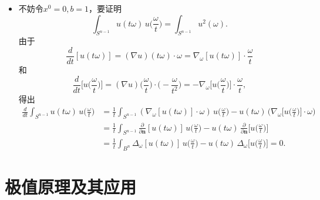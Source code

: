 \begin{itemize}
    \item[12.] 不妨令$x^0=0,b=1$，要证明
    \[\int_{S^{n-1}}u(t\omega)\,u\Big(\frac{\omega}{t}\Big)
    =\int_{S^{n-1}}u^2(\omega).\]
    由于
    \[\frac{d}{dt}[u(t\omega)]=(\nabla u)(t\omega)\cdot\omega
    =\nabla_\omega[u(t\omega)]\cdot\frac{\omega}{t}\]
    和
    \[\frac{d}{dt}\Big[u\Big(\frac{\omega}{t}\Big)\Big]
    =(\nabla u)\Big(\frac{\omega}{t}\Big)\cdot\Big(\!-\frac{\omega}{t^2}\Big)
    =-\nabla_\omega\Big[u\Big(\frac{\omega}{t}\Big)\Big]\cdot\frac{\omega}{t},\]
    得出
    \begin{align*}
        \frac{d}{dt}\int_{S^{n-1}}u(t\omega)\,u\Big(\frac{\omega}{t}\Big)
        &=\frac{1}{t}\int_{S^{n-1}}(\nabla_\omega[u(t\omega)]\cdot\omega)\,u\Big(\frac{\omega}{t}\Big)
        -u(t\omega)\,\Big(\nabla_\omega\Big[u\Big(\frac{\omega}{t}\Big)\Big]\cdot\omega\Big)\\
        &=\frac{1}{t}\int_{S^{n-1}}\frac{\partial}{\partial\boldsymbol{n}}[u(t\omega)]\,u\Big(\frac{\omega}{t}\Big)
        -u(t\omega)\,\frac{\partial}{\partial\boldsymbol{n}}\Big[u\Big(\frac{\omega}{t}\Big)\Big]\\
        &=\frac{1}{t}\int_{B^n}\Delta_\omega[u(t\omega)]\,u\Big(\frac{\omega}{t}\Big)
        -u(t\omega)\,\Delta_\omega\Big[u\Big(\frac{\omega}{t}\Big)\Big]=0.
    \end{align*}
\end{itemize}

\section{极值原理及其应用}

